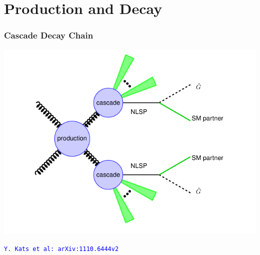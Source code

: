 \documentclass{beamer}
\begin{document}
\section{Production and Decay}
\begin{frame}
\frametitle{\Huge Cascade Decay Chain}
   \begin{minipage}[t]{0.7\linewidth}
      \includegraphics[width=0.80\paperwidth]{THESISPLOTS/SUSY-DECAY.pdf}
 \end{minipage}
 \newline \textcolor{blue} {\texttt{Y. Kats et al: arXiv:1110.6444v2}}
    
\end{frame}    
\end{document}
